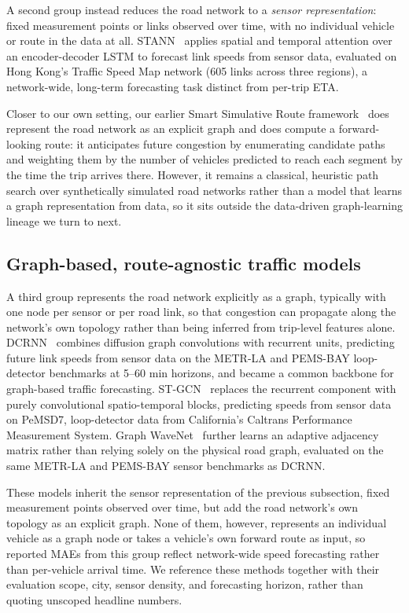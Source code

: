 A second group instead reduces the road network to a \emph{sensor representation}: fixed measurement points or links observed over time, with no individual vehicle or route in the data at all. STANN~\cite{stann2019} applies spatial and temporal attention over an encoder-decoder LSTM to forecast link speeds from sensor data, evaluated on Hong Kong's Traffic Speed Map network (605 links across three regions), a network-wide, long-term forecasting task distinct from per-trip ETA.

Closer to our own setting, our earlier Smart Simulative Route framework~\cite{SmartSimulativeRoute2025} does represent the road network as an explicit graph and does compute a forward-looking route: it anticipates future congestion by enumerating candidate paths and weighting them by the number of vehicles predicted to reach each segment by the time the trip arrives there. However, it remains a classical, heuristic path search over synthetically simulated road networks rather than a model that learns a graph representation from data, so it sits outside the data-driven graph-learning lineage we turn to next.

\subsection{Graph-based, route-agnostic traffic models}\label{sec:rw-graph-no-route}
A third group represents the road network explicitly as a graph, typically with one node per sensor or per road link, so that congestion can propagate along the network's own topology rather than being inferred from trip-level features alone. DCRNN~\cite{dcrnn2018} combines diffusion graph convolutions with recurrent units, predicting future link speeds from sensor data on the METR-LA and PEMS-BAY loop-detector benchmarks at 5--60 min horizons, and became a common backbone for graph-based traffic forecasting. ST-GCN~\cite{yu2018stgcn} replaces the recurrent component with purely convolutional spatio-temporal blocks, predicting speeds from sensor data on PeMSD7, loop-detector data from California's Caltrans Performance Measurement System. Graph WaveNet~\cite{wu2019graphwavenet} further learns an adaptive adjacency matrix rather than relying solely on the physical road graph, evaluated on the same METR-LA and PEMS-BAY sensor benchmarks as DCRNN.

These models inherit the sensor representation of the previous subsection, fixed measurement points observed over time, but add the road network's own topology as an explicit graph. None of them, however, represents an individual vehicle as a graph node or takes a vehicle's own forward route as input, so reported MAEs from this group reflect network-wide speed forecasting rather than per-vehicle arrival time. We reference these methods together with their evaluation scope, city, sensor density, and forecasting horizon, rather than quoting unscoped headline numbers.

